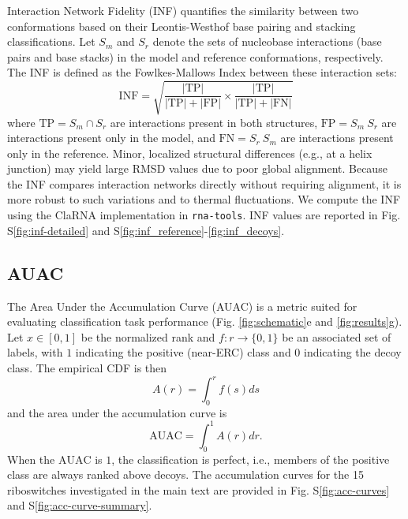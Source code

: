 \documentclass[%
aip,
 amsmath,amssymb,
reprint,%
twocolumn,
]{revtex4-1}
\makeatletter
\newcommand\setcurrentname[1]{\def\@currentlabelname{#1}}
\makeatother
\begin{document}
{Interaction Network Fidelity (INF) quantifies the similarity between two conformations based on their Leontis-Westhof base pairing and stacking classifications.\cite{parisien2009new,leontis2001geometric} Let $S_m$ and $S_r$ denote the sets of nucleobase interactions (base pairs and base stacks) in the model and reference conformations, respectively. The INF is defined as the Fowlkes-Mallows Index between these interaction sets:
\begin{equation}
\mathrm{INF} = \sqrt{\frac{|\mathrm{TP}|}{|\mathrm{TP}|+|\mathrm{FP}|}\times \frac{|\mathrm{TP}|}{|\mathrm{TP}|+|\mathrm{FN}|}}
\end{equation}
where $\mathrm{TP} = S_m \cap S_r$ are interactions present in both structures, $\mathrm{FP} = S_m \ S_r$ are interactions present only in the model, and $\mathrm{FN} = S_r \ S_m$ are interactions present only in the reference. Minor, localized structural differences (e.g., at a helix junction) may yield large RMSD values due to poor global alignment. Because the INF compares interaction networks directly without requiring alignment, it is more robust to such variations and to thermal fluctuations. We compute the INF using the ClaRNA\cite{walen2014clarna} implementation in \texttt{rna-tools}\cite{magnus2020rna}. INF values are reported in Fig. S\ref{fig:inf-detailed} and S\ref{fig:inf_reference}-\ref{fig:inf_decoys}.

\subsection*{AUAC}
       \setcurrentname{AUAC}
\label{methods:auac}
The Area Under the Accumulation Curve (AUAC) is a metric suited for evaluating classification task performance (Fig. \ref{fig:schematic}e and \ref{fig:results}g).\cite{truchon2007evaluating} Let $x\in [0,1]$ be the normalized rank and $f:r \rightarrow \{0,1\}$ be an associated set of labels, with $1$ indicating the positive (near-ERC) class and $0$ indicating the decoy class. The empirical CDF is then
\begin{equation}
    A(r) = \int_0^r f(s)ds
\end{equation}
and the area under the accumulation curve is 
\begin{equation}
    \label{eq:auac}
    \mathrm{AUAC} = \int_0^1 A(r)dr.
\end{equation}
When the $\mathrm{AUAC}$ is $1$, the classification is perfect, i.e., members of the positive class are always ranked above decoys. The accumulation curves for the 15 riboswitches investigated in the main text are provided in Fig. S\ref{fig:acc-curves} and S\ref{fig:acc-curve-summary}.

}
\end{document}
